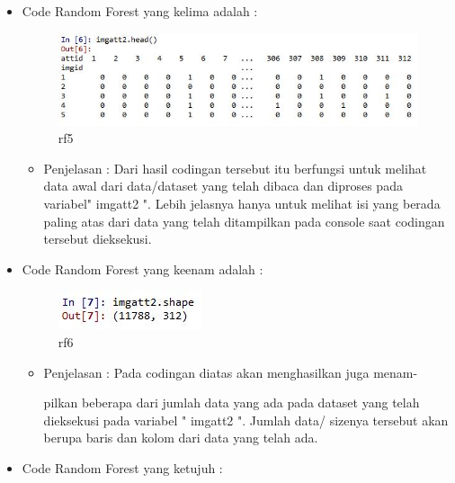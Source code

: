 \begin{enumerate}
\begin{itemize}
\begin{itemize}
\par
\par
\end{itemize}
\item Code Random Forest yang kelima adalah :
\par
\begin{figure}[ht]
\centering
\includegraphics[scale=0.2]{figures/rfcahya5.jpg}
\caption{rf5}
\label{contoh}
\end{figure}
\par
\begin{itemize}
\item Penjelasan : Dari hasil codingan tersebut itu berfungsi untuk melihat data awal dari data/dataset yang telah dibaca dan diproses pada variabel" imgatt2 ". Lebih jelasnya hanya untuk melihat isi yang berada paling atas dari data yang telah  ditampilkan pada console saat codingan tersebut  dieksekusi.
\par
\par
\end{itemize}
\item Code Random Forest yang keenam adalah :
\par
\begin{figure}[ht]
\centering
\includegraphics[scale=0.4]{figures/rfcahya6.jpg}
\caption{rf6}
\label{contoh}
\end{figure}
\par
\begin{itemize}\item Penjelasan : Pada codingan diatas akan menghasilkan juga menam-
\par pilkan beberapa dari jumlah data yang ada pada dataset yang telah dieksekusi pada variabel " imgatt2 ". Jumlah data/ sizenya tersebut akan berupa baris dan kolom dari data yang telah ada.
\par
\par
\end{itemize}
\item Code Random Forest yang ketujuh :

\end{itemize}
\end{enumerate}
